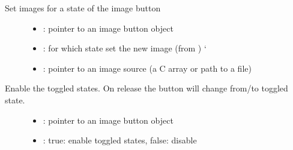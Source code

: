 \documentclass[letterpaper,10pt,english]{sphinxmanual}
\begin{document}
\begin{fulllineitems}
\label{\detokenize{object-types/imgbtn:_CPPv417lv_imgbtn_set_srcP8lv_obj_t14lv_btn_state_tPKv}}%
\pysigstartmultiline
{}\label{\detokenize{object-types/imgbtn:lv__imgbtn_8h_1ae53a399c19a555d7c823044b7a28afd9}}%
\pysigstopmultiline
Set images for a state of the image button \begin{description}
\item[{}] \leavevmode\begin{itemize}
\item {} 
: pointer to an image button object 

\item {} 
: for which state set the new image (from ) {}` 

\item {} 
: pointer to an image source (a C array or path to a file) 

\end{itemize}

\end{description}


\end{fulllineitems}


\begin{fulllineitems}
\label{\detokenize{object-types/imgbtn:_CPPv420lv_imgbtn_set_toggleP8lv_obj_tb}}%
\pysigstartmultiline
{}\label{\detokenize{object-types/imgbtn:lv__imgbtn_8h_1a3a00709f0d68a31b00000ae7fb0da463}}%
\pysigstopmultiline
Enable the toggled states. On release the button will change from/to toggled state. \begin{description}
\item[{}] \leavevmode\begin{itemize}
\item {} 
: pointer to an image button object 

\item {} 
: true: enable toggled states, false: disable 

\end{itemize}

\end{description}


\end{fulllineitems}
\end{document}
